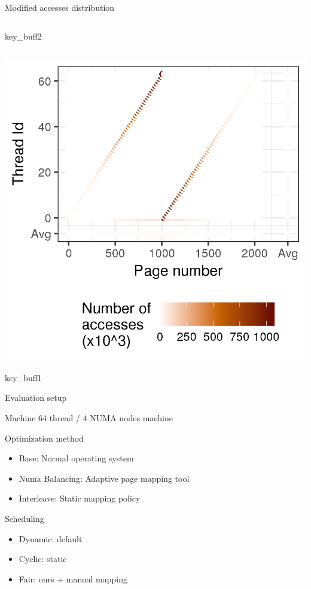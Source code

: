 \documentclass[xcolor={usenames,dvipsnames},hyperref={pdfusetitle}]{beamer}
\begin{document}
\begin{frame}{Modified accesses distribution}
{\begin{columns}
\begin{column}{.45\linewidth}
                \begin{block}{}
                    \centering
                    key\_buff2
                \end{block}
            \end{column}
        \end{columns}
    }{
        \centering
        \includegraphics[width=.6\linewidth]{tabarnac/is_b_kb1_dist_m.png}
        \begin{block}{}
            \centering
            key\_buff1
        \end{block}
    }
    \pause
\end{frame}

\begin{frame}{Evaluation setup}
    \begin{block}{Machine}
        64 thread / 4 NUMA nodes machine
    \end{block}
    \pause
    \begin{block}{Optimization method}
        \begin{itemize}
            \item Base: Normal operating system
            \item Numa Balancing: Adaptive page mapping tool
            \item Interleave: Static mapping policy
        \end{itemize}
    \end{block}
    \pause
    \begin{exampleblock}{Scheduling}
        \begin{itemize}
            \item Dynamic: default
            \item Cyclic: static
            \item Fair: ours + manual mapping
        \end{itemize}
    \end{exampleblock}
\end{frame}
\end{document}
